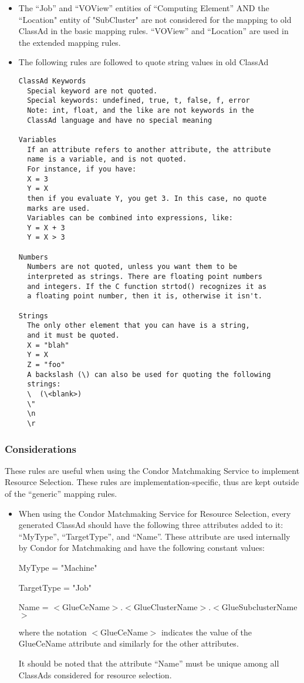 \documentclass[12pt]{article}
\begin{document}
\begin{itemize}
\item The ``Job'' and ``VOView'' entities of ``Computing Element'' AND the
``Location" entity of "SubCluster" are not considered for the
mapping to old ClassAd in the basic mapping rules. ``VOView'' and
``Location'' are used in the extended mapping rules.

\item The following rules are followed to quote string values in old ClassAd
\begin{verbatim}
ClassAd Keywords
  Special keyword are not quoted.
  Special keywords: undefined, true, t, false, f, error
  Note: int, float, and the like are not keywords in the
  ClassAd language and have no special meaning

Variables
  If an attribute refers to another attribute, the attribute
  name is a variable, and is not quoted.
  For instance, if you have:
  X = 3
  Y = X
  then if you evaluate Y, you get 3. In this case, no quote
  marks are used.
  Variables can be combined into expressions, like:
  Y = X + 3
  Y = X > 3

Numbers
  Numbers are not quoted, unless you want them to be
  interpreted as strings. There are floating point numbers
  and integers. If the C function strtod() recognizes it as
  a floating point number, then it is, otherwise it isn't.

Strings
  The only other element that you can have is a string,
  and it must be quoted.
  X = "blah"
  Y = X
  Z = "foo"
  A backslash (\) can also be used for quoting the following
  strings:
  \  (\<blank>)
  \"
  \n
  \r
\end{verbatim}
\end{itemize}

\subsubsection{Considerations}

These rules are useful when using the Condor Matchmaking Service to
implement Resource Selection. These rules are
implementation-specific, thus are kept outside of the ``generic''
mapping rules.

\begin{itemize}
\item When using the Condor Matchmaking Service for Resource Selection,
every generated ClassAd should have the following three attributes
added to it: ``MyType'', ``TargetType'', and ``Name''. These
attribute are used internally by Condor for Matchmaking and have the
following constant values:

MyType = "Machine"

TargetType = "Job"

Name = $<$GlueCeName$>$.$<$GlueClusterName$>$.$<$GlueSubclusterName$>$

where the notation $<$GlueCeName$>$ indicates the value of the GlueCeName
attribute and similarly for the other attributes.

It should be noted that the attribute ``Name'' must be unique among
all ClassAds considered for resource selection.
\end{itemize}
\end{document}
